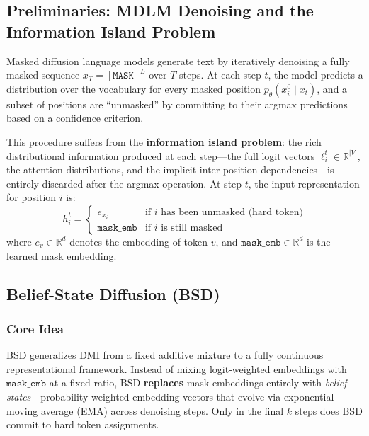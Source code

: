 \documentclass{article}
\begin{document}
\subsection{Preliminaries: MDLM Denoising and the Information Island Problem}

Masked diffusion language models generate text by iteratively denoising a fully masked sequence $x_T = [\texttt{MASK}]^L$ over $T$ steps. At each step $t$, the model predicts a distribution over the vocabulary for every masked position $p_\theta(x_i^0 \mid x_t)$, and a subset of positions are ``unmasked'' by committing to their argmax predictions based on a confidence criterion.

This procedure suffers from the \textbf{information island problem}: the rich distributional information produced at each step---the full logit vectors $\ell_i^t \in \mathbb{R}^{|V|}$, the attention distributions, and the implicit inter-position dependencies---is entirely discarded after the argmax operation. At step $t$, the input representation for position $i$ is:
\begin{equation}
h_i^t = \begin{cases} e_{x_i} & \text{if } i \text{ has been unmasked (hard token)} \\ \texttt{mask\_emb} & \text{if } i \text{ is still masked} \end{cases}
\label{eq:mask_input}
\end{equation}
where $e_v \in \mathbb{R}^d$ denotes the embedding of token $v$, and $\texttt{mask\_emb} \in \mathbb{R}^d$ is the learned mask embedding.

\subsection{Belief-State Diffusion (BSD)}
\label{sec:bsd}

\subsubsection{Core Idea}

BSD generalizes DMI from a fixed additive mixture to a fully continuous representational framework. Instead of mixing logit-weighted embeddings with $\texttt{mask\_emb}$ at a fixed ratio, BSD \textbf{replaces} mask embeddings entirely with \emph{belief states}---probability-weighted embedding vectors that evolve via exponential moving average (EMA) across denoising steps. Only in the final $k$ steps does BSD commit to hard token assignments.
\end{document}
